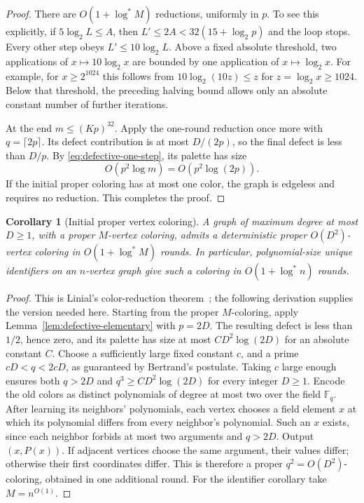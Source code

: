 \documentclass[11pt]{article}
\newtheorem{corollary}[theorem]{Corollary}
\theoremstyle{definition}
\theoremstyle{remark}
\begin{document}
\begin{proof}
There are $O(1+\log^*M)$ reductions, uniformly in $p$.
To see this explicitly, if $5\log_2L\le A$, then
$L'\le2A<32(15+\log_2p)$ and the loop stops.
Every other step obeys $L'\le10\log_2L$.
Above a fixed absolute threshold, two applications of
$x\mapsto10\log_2x$ are bounded by one application of $x\mapsto\log_2x$.
For example, for $x\ge2^{1024}$ this follows from
$10\log_2(10z)\le z$ for $z=\log_2x\ge1024$.
Below that threshold, the preceding halving bound allows only an
absolute constant number of further iterations.

At the end $m\le(Kp)^{32}$.  Apply the one-round reduction once more
with $q=\lceil2p\rceil$.  Its defect contribution is at most $D/(2p)$,
so the final defect is less than $D/p$.  By
\eqref{eq:defective-one-step}, its palette has size
\[
 O(p^2\log m)=O(p^2\log(2p)).
\]
If the initial proper coloring has at most one color, the graph is
edgeless and requires no reduction.  This completes the proof.
\end{proof}

\begin{corollary}[Initial proper vertex coloring]\label{cor:initial-vertex-coloring}
A graph of maximum degree at most $D\ge1$, with a proper $M$-vertex coloring, admits a deterministic proper $O(D^2)$-vertex coloring in $O(1+\log^* M)$ rounds. In particular, polynomial-size unique identifiers on an $n$-vertex graph give such a coloring in $O(1+\log^*n)$ rounds.
\end{corollary}

\begin{proof}
This is Linial's color-reduction theorem~\cite{Linial}; the following
derivation supplies the version needed here.  Starting from the proper $M$-coloring, apply
Lemma~\ref{lem:defective-elementary} with $p=2D$.
The resulting defect is less than $1/2$, hence zero, and its palette
has size at most $C D^2\log(2D)$ for an absolute constant $C$.
Choose a sufficiently large fixed constant $c$, and a prime
$cD<q<2cD$, as guaranteed by Bertrand's postulate.
Taking $c$ large enough ensures both $q>2D$ and
$q^3\ge CD^2\log(2D)$ for every integer $D\ge1$.
Encode the old colors as distinct polynomials of degree at most two
over the field $\mathbb F_q$.
After learning its neighbors' polynomials, each vertex chooses a field
element $x$ at which its polynomial differs from every neighbor's
polynomial.  Such an $x$ exists, since each neighbor forbids at most
two arguments and $q>2D$.  Output $(x,P(x))$.
If adjacent vertices choose the same argument, their values differ;
otherwise their first coordinates differ.  This is therefore a proper
$q^2=O(D^2)$-coloring, obtained in one additional round. For the identifier corollary take $M=n^{O(1)}$.
\end{proof}
\end{document}

